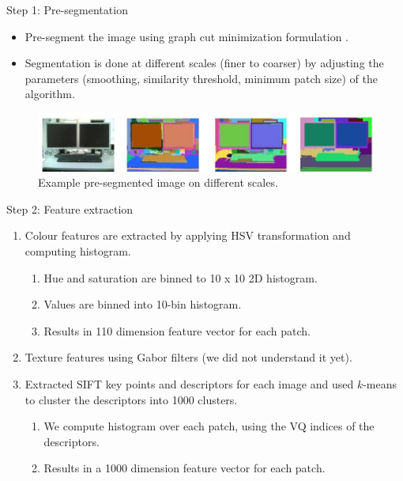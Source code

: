 \documentclass{beamer}
\begin{document}
\begin{frame}{Step 1: Pre-segmentation}
    \begin{itemize}
        \item Pre-segment the image using graph cut minimization formulation \cite{Felzenszwalb:2004}.
        \item Segmentation is done at different scales (finer to coarser) by adjusting the parameters (smoothing, similarity threshold, minimum patch size) of the algorithm.        
    \end{itemize}
    \begin{figure}[!hbp]
        \centering
        \includegraphics[width=0.9\linewidth]{images/seg_ex}
        \caption{Example pre-segmented image on different scales.}
        \label{fig_seg_ex}
    \end{figure}
\end{frame}

\begin{frame}{Step 2: Feature extraction}
  \begin{enumerate}
   \item Colour features are extracted by applying HSV transformation and computing histogram.
  \begin{enumerate}
  \item Hue and saturation are binned to 10 x 10 2D histogram.
  \item Values are binned into 10-bin histogram.
  \item Results in 110 dimension feature vector for each patch.
 \end{enumerate}
  \item Texture features using Gabor filters (we did not understand it yet).
  \item Extracted SIFT key points and descriptors for each image and used $k$-means to cluster the descriptors into 1000 clusters.
  \begin{enumerate}
      \item We compute histogram over each patch, using the VQ indices of the descriptors.
      \item Results in a 1000 dimension feature vector for each patch.
  \end{enumerate}        
  \end{enumerate}
\end{frame}
\end{document}
